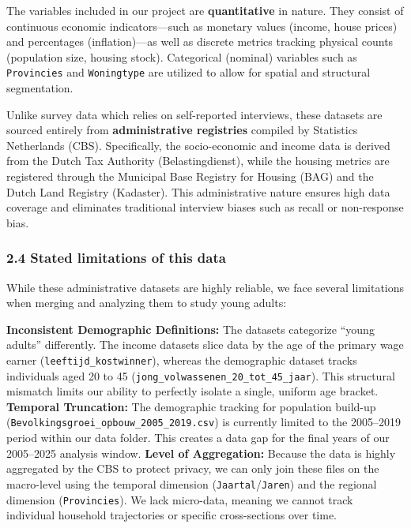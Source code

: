 \documentclass[
]{article}
\begin{document}
The variables included in our project are \textbf{quantitative} in
nature. They consist of continuous economic indicators---such as
monetary values (income, house prices) and percentages (inflation)---as
well as discrete metrics tracking physical counts (population size,
housing stock). Categorical (nominal) variables such as
\texttt{Provincies} and \texttt{Woningtype} are utilized to allow for
spatial and structural segmentation.

Unlike survey data which relies on self-reported interviews, these
datasets are sourced entirely from \textbf{administrative registries}
compiled by Statistics Netherlands (CBS). Specifically, the
socio-economic and income data is derived from the Dutch Tax Authority
(Belastingdienst), while the housing metrics are registered through the
Municipal Base Registry for Housing (BAG) and the Dutch Land Registry
(Kadaster). This administrative nature ensures high data coverage and
eliminates traditional interview biases such as recall or non-response
bias.

\subsubsection{2.4 Stated limitations of this
data}\label{stated-limitations-of-this-data}

While these administrative datasets are highly reliable, we face several
limitations when merging and analyzing them to study young adults:

\textbf{Inconsistent Demographic Definitions:} The datasets categorize
``young adults'' differently. The income datasets slice data by the age
of the primary wage earner (\texttt{leeftijd\_kostwinner}), whereas the
demographic dataset tracks individuals aged 20 to 45
(\texttt{jong\_volwassenen\_20\_tot\_45\_jaar}). This structural
mismatch limits our ability to perfectly isolate a single, uniform age
bracket. \textbf{Temporal Truncation:} The demographic tracking for
population build-up (\texttt{Bevolkingsgroei\_opbouw\_2005\_2019.csv})
is currently limited to the 2005--2019 period within our data folder.
This creates a data gap for the final years of our 2005--2025 analysis
window. \textbf{Level of Aggregation:} Because the data is highly
aggregated by the CBS to protect privacy, we can only join these files
on the macro-level using the temporal dimension
(\texttt{Jaartal}/\texttt{Jaren}) and the regional dimension
(\texttt{Provincies}). We lack micro-data, meaning we cannot track
individual household trajectories or specific cross-sections over time.
\end{document}
